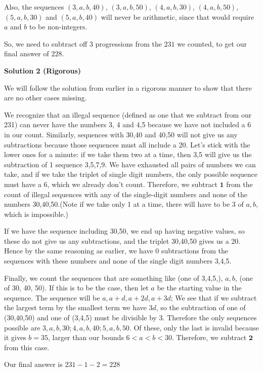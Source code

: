 \begin{enumerate}
 Also, the sequences $(3,a,b,40)$, $(3,a,b,50)$, $(4,a,b,30)$, $(4,a,b,50)$, $(5,a,b,30)$ and $(5,a,b,40)$ will never be arithmetic, since that would require $a$ and $b$ to be non-integers.

 So, we need to subtract off $3$ progressions from the $231$ we counted, to get our final answer of $\boxed{228}$.

 



\textbf{Solution 2 (Rigorous)}

We will follow the solution from earlier in a rigorous manner to show that there are no other cases missing.

 We recognize that an illegal sequence (defined as one that we subtract from our 231) can never have the numbers {3, 4} and {4,5} because we have not included a 6 in our count. Similarly, sequences with {30,40} and {40,50} will not give us any subtractions because those sequences must all include a 20. Let's stick with the lower ones for a minute: if we take them two at a time, then {3,5} will give us the subtraction of 1 sequence {3,5,7,9}. We have exhausted all pairs of numbers we can take, and if we take the triplet of single digit numbers, the only possible sequence must have a 6, which we already don't count. Therefore, we subtract $\textbf{1}$ from the count of illegal sequences with any of the single-digit numbers and none of the numbers 30,40,50.(Note if we take only 1 at a time, there will have to be 3 of $a, b$, which is impossible.)

 If we have the sequence including {30,50}, we end up having negative values, so these do not give us any subtractions, and the triplet {30,40,50} gives us a 20. Hence by the same reasoning as earlier, we have 0 subtractions from the sequences with these numbers and none of the single digit numbers {3,4,5}.

 Finally, we count the sequences that are something like (one of 3,4,5,), $a, b$, (one of 30, 40, 50). If this is to be the case, then let $a$ be the starting value in the sequence. The sequence will be $a, a+d, a+2d, a+3d$; We see that if we subtract the largest term by the smallest term we have $3d$, so the subtraction of one of (30,40,50) and one of (3,4,5) must be divisible by 3. Therefore the only sequences possible are $3,a,b,30; 4,a,b,40; 5,a,b,50$. Of these, only the last is invalid because it gives $b = 35$, larger than our bounds $6<a<b<30$. Therefore, we subtract $\textbf{2}$ from this case.

 Our final answer is $231 - 1 - 2 = \boxed{228}$





\end{enumerate}
